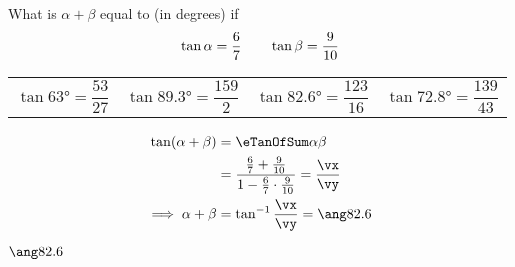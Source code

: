 

\FRACADD\va\vb\vc\vd\vp\vq
\FRACMULT\va\vb\vc\vd\vr\vs
{}\vr\vs\vt\vu
\FRACDIV\vp\vq\vt\vu\vx\vy

\question[1] What is $\alpha+ \beta$ equal to (in degrees) if 
\[ \tan\alpha=\dfrac{6}{7}\qquad\tan\beta=\dfrac{9}{10} \]

\watchout

\begin{calcaid}
  \begin{tabular}{c c c c}
    $\tan\ang{63}=\dfrac{53}{27}$ & $\tan\ang{89.3}=\dfrac{159}{2}$ & $\tan\ang{82.6}=\dfrac{123}{16}$ & $\tan\ang{72.8}=\dfrac{139}{43}$
  \end{tabular}
\end{calcaid}

\begin{solution}[\mcq]
  \begin{align}
    \tan(\alpha + \beta) &= \eTanOfSum\alpha\beta \\
    &= \dfrac{\frac\va\vb + \frac\vc\vd}{1-\frac\va\vb\cdot\frac\vc\vd} = \dfrac\vx\vy \\
    \implies \alpha+\beta &= \tan^{-1}\dfrac\vx\vy = \ang\ve
  \end{align}
\end{solution}

\ifprintanswers\begin{codex}$\ang\ve$\end{codex}\fi
